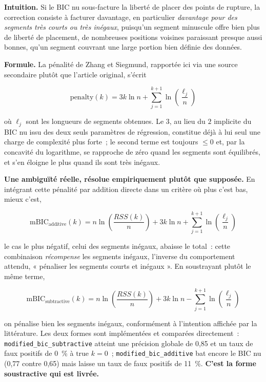 \documentclass[11pt]{article}
\newcommand{\code}[1]{\texttt{#1}}
\begin{document}
\textbf{Intuition.} Si le BIC nu sous-facture la liberté de placer des
points de rupture, la correction consiste à facturer davantage, en
particulier \emph{davantage pour des segments très courts ou très
inégaux}, puisqu'un segment minuscule offre bien plus de liberté de
placement, de nombreuses positions voisines paraissant presque aussi
bonnes, qu'un segment couvrant une large portion bien définie des données.

\textbf{Formule.} La pénalité de Zhang et Siegmund, rapportée ici via une
source secondaire plutôt que l'article original, s'écrit

\begin{equation}
\text{penalty}(k) = 3k \ln n + \sum_{j=1}^{k+1} \ln\!\left(\frac{\ell_j}{n}\right)
\end{equation}

où $\ell_j$ sont les longueurs de segments obtenues. Le $3$, au lieu du $2$
implicite du BIC nu issu des deux seuls paramètres de régression,
constitue déjà à lui seul une charge de complexité plus forte~; le second
terme est toujours $\le 0$ et, par la concavité du logarithme, se
rapproche de zéro quand les segments sont équilibrés, et s'en éloigne le
plus quand ils sont très inégaux.

\textbf{Une ambiguïté réelle, résolue empiriquement plutôt que supposée.}
En intégrant cette pénalité par addition directe dans un critère où plus
c'est bas, mieux c'est,

\begin{equation}
\mathrm{mBIC}_{\text{additive}}(k) = n \ln\!\left(\frac{RSS(k)}{n}\right) + 3k \ln n + \sum_{j=1}^{k+1} \ln\!\left(\frac{\ell_j}{n}\right)
\end{equation}

le cas le plus négatif, celui des segments inégaux, abaisse le total~:
cette combinaison \emph{récompense} les segments inégaux, l'inverse du
comportement attendu, « pénaliser les segments courts et inégaux ». En
soustrayant plutôt le même terme,

\begin{equation}
\mathrm{mBIC}_{\text{subtractive}}(k) = n \ln\!\left(\frac{RSS(k)}{n}\right) + 3k \ln n - \sum_{j=1}^{k+1} \ln\!\left(\frac{\ell_j}{n}\right)
\end{equation}

on pénalise bien les segments inégaux, conformément à l'intention affichée
par la littérature. Les deux formes sont implémentées et comparées
directement~: \code{modified\_bic\_subtractive} atteint une précision
globale de 0,85 et un taux de faux positifs de 0~\% à $\text{true } k = 0$~;
\code{modified\_bic\_additive} bat encore le BIC nu (0,77 contre 0,65) mais
laisse un taux de faux positifs de 11~\%. \textbf{C'est la forme
soustractive qui est livrée.}
\end{document}
